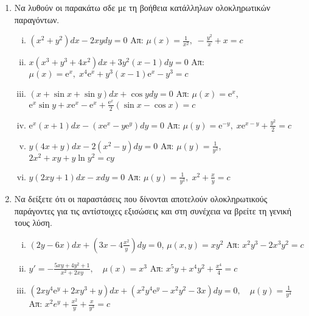 \begin{enumerate}
\item Να λυθούν οι παρακάτω σδε με τη βοήθεια κατάλληλων ολοκληρωτικών παραγόντων.
	
  \begin{enumerate}[i)]
    \item $ (x^{2}+y^{2})dx - 2xydy = 0 $   
      \hfill Απ: $ \mu(x)= \frac{1}{x^{2}}, \; - \frac{y^{2}}{x} + x = c $
    \item $ x(x^{3}+y^{3}+4x^{2})dx+ 3y^{2}(x-1)dy=0 $ %
      \hfill Απ: $ \mu (x)= \mathrm{e}^{x}, \; x^{4} \mathrm{e}^{x} + y^{3}(x-1)
      \mathrm{e}^{x} - y^{3}=c $ 
    \item $ (x+ \sin{x} + \sin{y} )dx + \cos{y} dy=0 $ %
      \hfill Απ: $ \mu (x) = \mathrm{e}^{x} $, \; $ \mathrm{e}^{x} \sin{y} + x
      \mathrm{e}^{x} - \mathrm{e}^{x} + \frac{\mathrm{e}^{x}}{2} (\sin{x} - \cos{x})=c$
    \item $ \mathrm{e}^{x}(x+1)dx - (x \mathrm{e}^{x}-y \mathrm{e}^{y})dy = 0 $ 
      \hfill Απ: $ \mu(y) = \mathrm{e}^{-y}, \; x\mathrm{e}^{x-y} +\frac{y^{2}}{2}=c$
    \item $ y(4x+y)dx-2(x^{2}-y)dy=0 $ %
      \hfill Απ: $ \mu (y) = \frac{1}{y^{2}} $, \; $ 2x^{2}+xy+y \ln{y^{2}} = cy $  
    \item $ y(2xy+1)dx-xdy=0 $ %
      \hfill Απ: $ \mu (y) = \frac{1}{y^{2}}, \; x^{2} + \frac{x}{y} = c $ 
  \end{enumerate}

\item Να δείξετε ότι οι παραστάσεις που δίνονται αποτελούν ολοκληρωτικούς παράγοντες για
  τις αντίστοιχες εξισώσεις και στη συνέχεια να βρείτε τη γενική τους λύση.
  \begin{enumerate}[i)]
      \item $ (2y-6x)dx+\left(3x-4\frac{x^{2}}{y}\right)dy=0 $, \; $ \mu (x,y) = xy^{2} $
        \hfill Απ: $ x^{2}y^{3}-2x^{3}y^{2}=c $ %
      \item $ y' =- \frac{5xy+4y^{2}+1}{x^{2}+2xy}, \quad \mu(x)=x^{3} $  
        \hfill Απ: $ x^{5}y+x^{4}y^{2} + \frac{x^{4}}{4} = c $ 
      \item $ (2xy^{4} \mathrm{e}^{y} + 2xy^{3}+y)dx + (x^{2}y^{4}\mathrm{e}^{y} -
        x^{2}y^{2}-3x)dy=0, \quad \mu (y) = \frac{1}{y^{4}} $ 
        \hfill Απ: $ x^{2}e^{y}+ \frac{x^{2}}{y} + \frac{x}{y^{3}} =c $ 
  \end{enumerate}


\end{enumerate}
